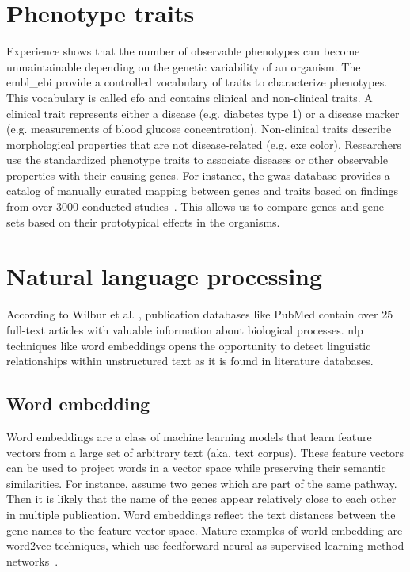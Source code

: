 \documentclass{thesisclass}
\begin{document}
\section{Phenotype traits}


Experience shows that the number of observable phenotypes can become unmaintainable depending on the genetic variability of an organism. 
The \acrfull{embl_ebi} provide a controlled vocabulary of traits to characterize phenotypes. 
This vocabulary is called \acrfull{efo} and contains clinical and non-clinical traits. 
A clinical trait represents either a disease (e.g. diabetes type 1) or a disease marker (e.g. measurements of blood glucose concentration). 
Non-clinical traits describe morphological properties that are not disease-related (e.g. exe color). 
Researchers use the standardized phenotype traits to associate diseases or other observable properties with their causing genes. For instance, the \acrfull{gwas} database provides a catalog of manually curated mapping between genes and traits based on findings from over 3000 conducted studies~\cite{doi:10.1093/nar/gkw1133}.
This allows us to compare genes and gene sets based on their prototypical effects in the organisms. 

\section{Natural language processing}


According to Wilbur et al. \cite{KIM2017122}, publication databases like PubMed contain over 25 full-text articles with valuable information about biological processes. \acrfull{nlp} techniques like word embeddings opens the opportunity to detect linguistic relationships within unstructured text as it is found in literature databases.

\subsection{Word embedding}

Word embeddings are a class of machine learning models that learn feature vectors from a large set of arbitrary text (aka. text corpus). These feature vectors can be used to project words in a vector space while preserving their semantic similarities. For instance, assume two genes which are part of the same pathway. Then it is likely that the name of the genes appear relatively close to each other in multiple publication. Word embeddings reflect the text distances between the gene names to the feature vector space. Mature examples of world embedding are word2vec techniques, which use feedforward neural as supervised learning method networks~\cite{journals/corr/abs-1301-3781}. 
\end{document}
